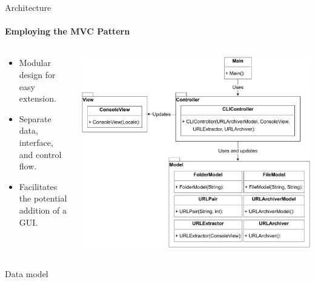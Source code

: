 \documentclass[
    ngerman,%
    authorontitle=true,
]{bfhbeamer}
\begin{document}
    \begin{frame}{Architecture}
        \framesubtitle{Employing the MVC Pattern}

        \begin{columns} %
            \begin{column}{0.5\textwidth} %
                \begin{itemize}
                    \item Modular design for easy extension.
                    \item Separate data, interface, and control flow.
                    \item Facilitates the potential addition of a GUI.
                \end{itemize}
            \end{column}

            \begin{column}{0.5\textwidth} %
                \includegraphics[width=1\textwidth]{pictures/mvc_diagram}
            \end{column}
        \end{columns} %
    \end{frame}

    \begin{frame}{Data model}
        \framesubtitle{}
    \end{frame}
\end{document}
